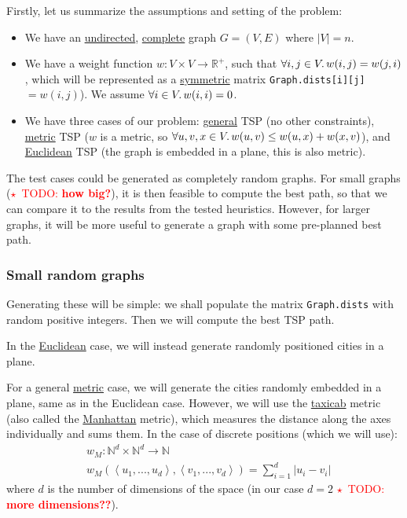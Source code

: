 \documentclass{article}
\newcommand{\todo}[1]{\textcolor{red}{$\star$~TODO: \textbf{#1}}}
\newcommand{\R}{\mathbb{R}}
\newcommand{\uu}[1]{\underline{#1}}
\newcommand{\py}[1]{\lstinline[language=Python]{#1}}
\begin{document}
Firstly, let us summarize the assumptions and setting of the problem:
\begin{itemize}
\item We have an \uu{undirected}, \uu{complete} graph $G=(V,E)$ where $|V|=n$.
\item We have a weight function $w:V\times V\to\R^{+}$, such that
  $\forall i,j\in V \ldotp w(i,j) = w(j,i)$, which will be represented as
  a \uu{symmetric} matrix \py{Graph.dists[i][j]}\,$= w(i,j)$).
  We assume $\forall i\in V\ldotp w(i,i)=0$.
\item We have three cases of our problem: \uu{general} TSP
  (no other constraints), \uu{metric} TSP ($w$ is a metric, so
  $\forall u,v,x\in V\ldotp w(u,v)\le w(u,x) + w(x,v)$), and
  \uu{Euclidean} TSP (the graph is embedded in a plane, this is also metric).
\end{itemize}

The test cases could be generated as completely random graphs. For small graphs
(\todo{how big?}), it is then feasible to compute the best path, so that we can
compare it to the results from the tested heuristics. However, for larger graphs,
it will be more useful to generate a graph with some pre-planned best path.

\subsubsection{Small random graphs}

Generating these will be simple: we shall populate the matrix
\py{Graph.dists} with random positive integers. Then we will
compute the best TSP path.

In the \uu{Euclidean} case, we will instead generate randomly positioned
cities in a plane.

For a general \uu{metric} case, we will generate the cities randomly embedded
in a plane, same as in the Euclidean case. However, we will use
the \uu{taxicab} metric (also called the \uu{Manhattan} metric), which measures
the distance along the axes individually and sums them. In the case of discrete
positions (which we will use):
\begin{align*}
  & w_M: \mathbb{N}^d \times \mathbb{N}^d \to \mathbb{N} \\
  & w_M\left(\left<u_1,...,u_d\right>, \left<v_1,...,v_d\right>\right) = \sum_{i=1}^d \left|u_i - v_i\right|
\end{align*}
where $d$ is the number of dimensions of the space (in our case $d=2$
\todo{more dimensions??}).
\end{document}
